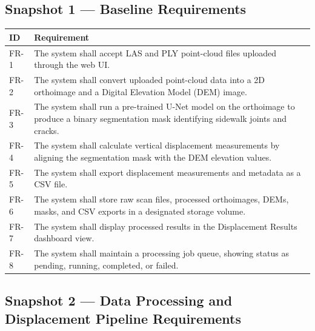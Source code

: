 \documentclass{article}
\begin{document}
\subsection{Snapshot 1 --- Baseline Requirements}

\begin{longtable}{|p{0.8in}|p{5.4in}|}
\hline
\textbf{ID} & \textbf{Requirement} \\
\hline
FR-1 & The system shall accept LAS and PLY point-cloud files uploaded through the web UI. \\
\hline
FR-2 & The system shall convert uploaded point-cloud data into a 2D orthoimage and a
  Digital Elevation Model (DEM) image. \\
\hline
FR-3 & The system shall run a pre-trained U-Net model on the orthoimage to produce a
  binary segmentation mask identifying sidewalk joints and cracks. \\
\hline
FR-4 & The system shall calculate vertical displacement measurements by aligning the
  segmentation mask with the DEM elevation values. \\
\hline
FR-5 & The system shall export displacement measurements and metadata as a CSV file. \\
\hline
FR-6 & The system shall store raw scan files, processed orthoimages, DEMs, masks, and
  CSV exports in a designated storage volume. \\
\hline
FR-7 & The system shall display processed results in the Displacement Results dashboard
  view. \\
\hline
FR-8 & The system shall maintain a processing job queue, showing status as pending,
  running, completed, or failed. \\
\hline
\end{longtable}

\subsection{Snapshot 2 --- Data Processing and Displacement Pipeline Requirements}
\end{document}
